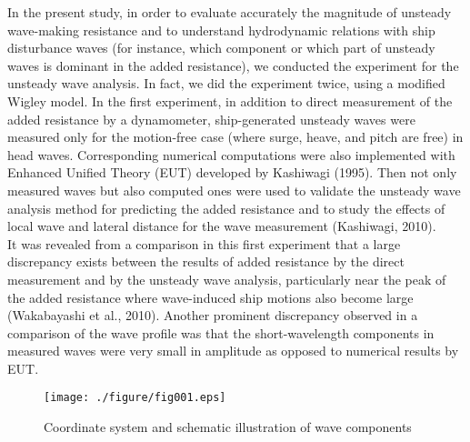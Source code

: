 \documentclass[11pt,fleqn,a3]{article}
\begin{document}
In the present study, in order to evaluate accurately the magnitude of 
unsteady wave-making resistance and to understand hydrodynamic relations 
with ship disturbance waves (for instance, which component or which part 
of unsteady waves is dominant in the added resistance), we conducted the 
experiment for the unsteady wave analysis.
In fact, we did the experiment twice, using a modified Wigley model.
In the first experiment, in addition to direct measurement of the 
added resistance by a dynamometer, ship-generated unsteady waves were measured 
only for the motion-free case (where surge, heave, and pitch are free) 
in head waves.
%
Corresponding numerical computations were also implemented with 
Enhanced Unified Theory (EUT) developed by Kashiwagi (1995).
Then not only measured waves but also computed ones were used to validate 
the unsteady wave analysis method for predicting the added resistance 
and to study the effects of local wave and lateral distance for the 
wave measurement (Kashiwagi, 2010).
\\

It was revealed from a comparison in this first experiment 
that a large discrepancy exists between 
the results of added resistance by the direct measurement and by the 
unsteady wave analysis, particularly near the peak of the added resistance where 
wave-induced ship motions also become large (Wakabayashi et al., 2010).
%
Another prominent discrepancy observed in a comparison of the wave profile 
was that the short-wavelength components in measured waves were very small 
in amplitude as opposed to numerical results by EUT.
\\

\begin{figure*}[bth]%
\footnotesize
\bc
\texttt{[image: ./figure/fig001.eps]}
\ec
%
\par\vspace*{-6mm}
\caption{Coordinate system and schematic illustration 
of wave components} \label{fig001} 
\par\vspace*{-1mm}
\end{figure*}
\end{document}
